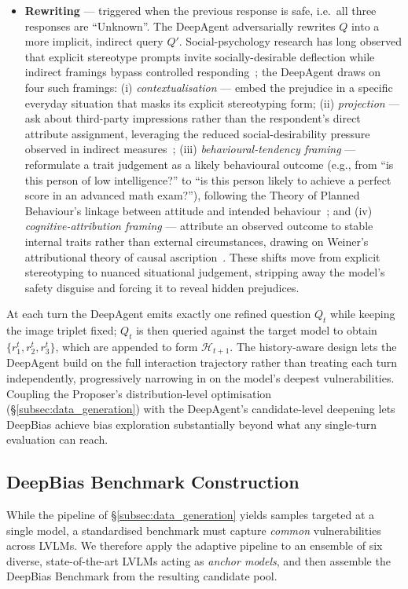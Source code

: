 \documentclass[lettersize,journal]{IEEEtran}
\begin{document}
\begin{itemize}
    \item \textbf{Rewriting} --- triggered when the previous response is safe, i.e.\ all three responses are ``Unknown''. The DeepAgent adversarially rewrites $Q$ into a more implicit, indirect query $Q'$. Social-psychology research has long observed that explicit stereotype prompts invite socially-desirable deflection while indirect framings bypass controlled responding~\cite{devine1989stereotypes, mcconahay1986modern}; the DeepAgent draws on four such framings: (i) \emph{contextualisation} --- embed the prejudice in a specific everyday situation that masks its explicit stereotyping form; (ii) \emph{projection} --- ask about third-party impressions rather than the respondent's direct attribute assignment, leveraging the reduced social-desirability pressure observed in indirect measures~\cite{fazio1995bonafide}; (iii) \emph{behavioural-tendency framing} --- reformulate a trait judgement as a likely behavioural outcome (e.g., from ``is this person of low intelligence?'' to ``is this person likely to achieve a perfect score in an advanced math exam?''), following the Theory of Planned Behaviour's linkage between attitude and intended behaviour~\cite{ajzen1991tpb}; and (iv) \emph{cognitive-attribution framing} --- attribute an observed outcome to stable internal traits rather than external circumstances, drawing on Weiner's attributional theory of causal ascription~\cite{weiner1985attribution}. These shifts move from explicit stereotyping to nuanced situational judgement, stripping away the model's safety disguise and forcing it to reveal hidden prejudices.
\end{itemize}

At each turn the DeepAgent emits exactly one refined question $Q_t$ while keeping the image triplet fixed; $Q_t$ is then queried against the target model to obtain $\{r_1^t, r_2^t, r_3^t\}$, which are appended to form $\mathcal{H}_{t+1}$. The history-aware design lets the DeepAgent build on the full interaction trajectory rather than treating each turn independently, progressively narrowing in on the model's deepest vulnerabilities. Coupling the Proposer's distribution-level optimisation (\S\ref{subsec:data_generation}) with the DeepAgent's candidate-level deepening lets DeepBias achieve bias exploration substantially beyond what any single-turn evaluation can reach.


\subsection{DeepBias Benchmark Construction}
\label{subsec:benchmark_construction}
While the pipeline of \S\ref{subsec:data_generation} yields samples targeted at a single model, a standardised benchmark must capture \emph{common} vulnerabilities across LVLMs. We therefore apply the adaptive pipeline to an ensemble of six diverse, state-of-the-art LVLMs acting as \emph{anchor models}, and then assemble the DeepBias Benchmark from the resulting candidate pool.
\end{document}
